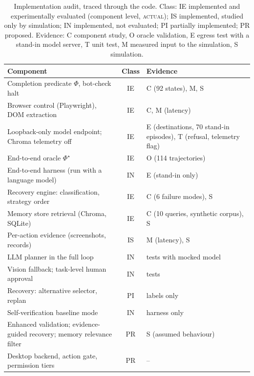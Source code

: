 \begin{table}[t]
\centering
\caption{Implementation audit, traced through the code. Class: IE implemented and experimentally evaluated (component level, \textsc{actual}); IS implemented, studied only by simulation; IN implemented, not evaluated; PI partially implemented; PR proposed. Evidence: C component study, O oracle validation, E egress test with a stand-in model server, T unit test, M measured input to the simulation, S simulation.}
\label{tab:status}
\scriptsize
\setlength{\tabcolsep}{2.4pt}
\begin{tabular}{@{}p{4.3cm}cp{2.6cm}@{}}
\toprule
Component & Class & Evidence \\
\midrule
Completion predicate $\Phi$, bot-check halt & IE & C (92 states), M, S \\
Browser control (Playwright), DOM extraction & IE & C, M (latency) \\
Loopback-only model endpoint; Chroma telemetry off & IE & E (destinations, 70 stand-in episodes), T (refusal, telemetry flag) \\
End-to-end oracle $\Phi^{\star}$ & IE & O (114 trajectories) \\
End-to-end harness (run with a language model) & IN & E (stand-in only) \\
Recovery engine: classification, strategy order & IE & C (6 failure modes), S \\
Memory store retrieval (Chroma, SQLite) & IE & C (10 queries, synthetic corpus), S \\
Per-action evidence (screenshots, records) & IS & M (latency), S \\
LLM planner in the full loop & IN & tests with mocked model \\
Vision fallback; task-level human approval & IN & tests \\
Recovery: alternative selector, replan & PI & labels only \\
Self-verification baseline mode & IN & harness only \\
Enhanced validation; evidence-guided recovery; memory relevance filter & PR & S (assumed behaviour) \\
Desktop backend, action gate, permission tiers & PR & -- \\
\bottomrule
\end{tabular}
\end{table}
